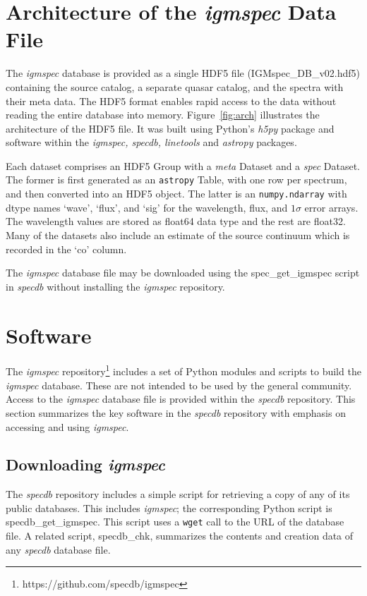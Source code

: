 \documentclass[12pt]{elsarticle}
\begin{document}
\section{Architecture of the {\it igmspec} Data File}
\label{sec:arch}

The {\it igmspec} database is provided as a single HDF5 file
(IGMspec\_DB\_v02.hdf5)
containing the source catalog, a separate quasar catalog,
and the spectra with their meta data.  
The HDF5 format enables rapid access to the data without
reading the entire database into memory.  
Figure~\ref{fig:arch} illustrates the 
architecture of the HDF5 file.
It was built using Python's {\it h5py} package
and software within the {\it igmspec, specdb, linetools}
and {\it astropy} packages.

Each dataset comprises an HDF5 Group
with a {\it meta} Dataset and a {\it spec} Dataset.
The former is first generated as an 
{\tt astropy} Table, with one row per
spectrum, and then converted into an HDF5 object.
The latter is an {\tt numpy.ndarray} 
with dtype names `wave', `flux', and `sig' for the
wavelength, flux, and $1\sigma$ error arrays.
The wavelength values are stored as float64 data type
and the rest are float32.
Many of the datasets also include 
an estimate of the source continuum which is
recorded in the `co' column.

The {\it igmspec} database file may be
downloaded using the spec\_get\_igmspec script in {\it specdb}
without installing the {\it igmspec} repository.


\section{Software}
\label{sec:software}

The {\it igmspec} repository\footnote{https://github.com/specdb/igmspec} 
includes a set of Python modules and scripts to build the
{\it igmspec} database.  
These are not intended to be used by the general community.
Access to the {\it igmspec}
database file is provided within the 
{\it specdb} repository.  This section summarizes the key
software in the {\it specdb} repository with emphasis
on accessing and using {\it igmspec}. 

\subsection{Downloading {\it igmspec}}

The {\it specdb} repository includes a simple script for retrieving
a copy of any of its public databases.  This includes {\it igmspec};
the corresponding Python script is specdb\_get\_igmspec.
This script uses a {\tt wget} call to the URL of the database file.
A related script, specdb\_chk, summarizes the contents and creation data
of any {\it specdb} database file.
\end{document}

